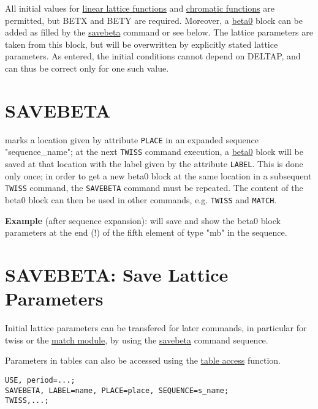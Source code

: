 All initial values for \href{../Introduction/tables.html#linear}{linear
  lattice functions} and
\href{../Introduction/tables.html#chrom}{chromatic functions} are
permitted, but BETX and BETY are required. Moreover, a
\href{beta0}{beta0} block can be added as filled by the
\href{../control/general.html#savebeta}{savebeta} command or see
below. The lattice parameters are taken from this block, but will be
overwritten by explicitly stated lattice parameters. As entered, the
initial conditions cannot depend on DELTAP, and can thus be correct only
for one such value.  

\section{SAVEBETA}
\label{sec:savebeta}
marks a location given by attribute \texttt{PLACE} in an expanded sequence "sequence\_name"; 
at the next \texttt{TWISS} command execution, a
\href{../twiss/twiss.html#beta0}{beta0} 
block will be saved at that location with the label given by the
attribute \texttt{LABEL}. 
This is done only once; in order to get a new beta0 block at the same
location in a subsequent \texttt{TWISS} command, the \texttt{SAVEBETA}
command  must be repeated.
The content of the beta0 block can then be used in other
commands, e.g. \texttt{TWISS} and \texttt{MATCH}.  

{\bf Example} (after sequence expansion): 
will save and show the beta0 block parameters at the end (!) of the
fifth element of type "mb" in the sequence.  


\section{SAVEBETA: Save Lattice Parameters}
\label{sec:savebeta}

Initial lattice parameters can be transfered for later commands, in
particular for twiss or the \href{../match/match.html}{match module}, by
using the \href{../control/general.html#savebeta}{savebeta} command
sequence.  

Parameters in tables can also be accessed 
using the \href{../Introduction/expression.html#table}{table access}
function. 
\begin{verbatim}
USE, period=...;
SAVEBETA, LABEL=name, PLACE=place, SEQUENCE=s_name;
TWISS,...;
\end{verbatim}

